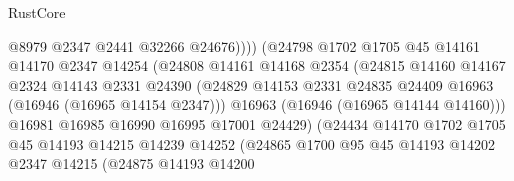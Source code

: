 \begin{lexlean}{RustCore}
\begin{coremodule}
                                        @8979
                                        @2347
                                        @2441
                                        @32266
                                        @24676))))
                                (@24798
                                  @1702
                                  @1705
                                  @45
                                  @14161
                                  @14170
                                  @2347
                                  @14254
                                  (@24808
                                    @14161
                                    @14168
                                    @2354
                                    (@24815
                                      @14160
                                      @14167
                                      @2324
                                      @14143
                                      @2331
                                      @24390
                                      (@24829
                                        @14153
                                        @2331
                                        @24835
                                        @24409
                                        @16963
                                        (@16946 (@16965 @14154 @2347)))
                                      @16963
                                      (@16946 (@16965 @14144 @14160)))
                                    @16981
                                    @16985
                                    @16990
                                    @16995
                                    @17001
                                    @24429)
                                  (@24434
                                    @14170
                                    @1702
                                    @1705
                                    @45
                                    @14193
                                    @14215
                                    @14239
                                    @14252
                                    (@24865
                                      @1700
                                      @95
                                      @45
                                      @14193
                                      @14202
                                      @2347
                                      @14215
                                      (@24875
                                        @14193
                                        @14200

\end{coremodule}
\end{lexlean}
